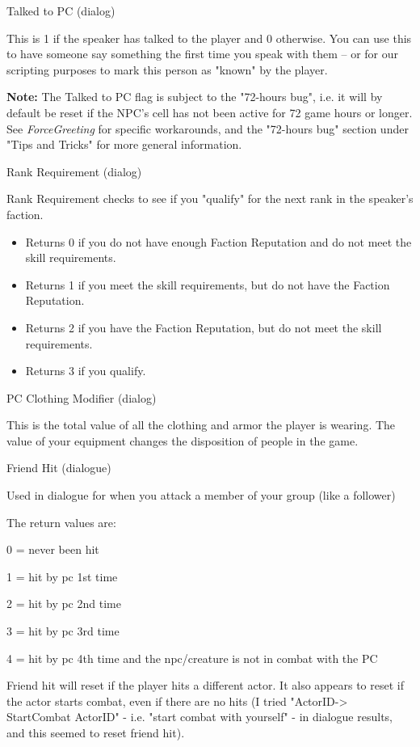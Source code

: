 Talked to PC (dialog)

This is 1 if the speaker has talked to the player and 0 otherwise. You
can use this to have someone say something the first time you speak with
them -- or for our scripting purposes to mark this person as "known" by
the player.

\textbf{Note:} The Talked to PC flag is subject to the "72-hours bug",
i.e. it will by default be reset if the NPC's cell has not been active
for 72 game hours or longer. See \emph{ForceGreeting} for specific
workarounds, and the "72-hours bug" section under "Tips and Tricks" for
more general information.

Rank Requirement (dialog)

Rank Requirement checks to see if you "qualify" for the next rank in the
speaker's faction.

\begin{itemize}
\item
  Returns 0 if you do not have enough Faction Reputation and do not meet
  the skill requirements.
\item
  Returns 1 if you meet the skill requirements, but do not have the
  Faction Reputation.
\item
  Returns 2 if you have the Faction Reputation, but do not meet the
  skill requirements.
\item
  Returns 3 if you qualify.
\end{itemize}

PC Clothing Modifier (dialog)

This is the total value of all the clothing and armor the player is
wearing. The value of your equipment changes the disposition of people
in the game.

Friend Hit (dialogue)

Used in dialogue for when you attack a member of your group (like a
follower)

The return values are:

0 = never been hit

1 = hit by pc 1st time

2 = hit by pc 2nd time

3 = hit by pc 3rd time

4 = hit by pc 4th time and the npc/creature is not in combat with the PC

Friend hit will reset if the player hits a different actor. It also
appears to reset if the actor starts combat, even if there are no hits
(I tried "ActorID-> StartCombat ActorID" - i.e. "start combat
with yourself" - in dialogue results, and this seemed to reset friend
hit).

